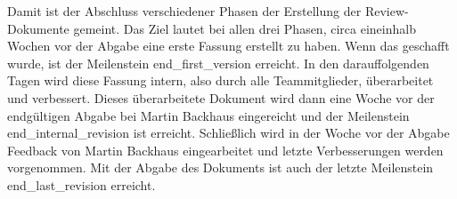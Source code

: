 \documentclass[../review_1.tex]{subfiles}
\begin{document}
Damit ist der Abschluss verschiedener Phasen der Erstellung der Review-Dokumente gemeint. Das Ziel lautet bei allen drei Phasen, circa eineinhalb Wochen vor der Abgabe eine erste Fassung erstellt zu haben. Wenn das geschafft wurde, ist der Meilenstein end\_first\_version erreicht. In den darauffolgenden Tagen wird diese Fassung intern, also durch alle Teammitglieder, überarbeitet und verbessert. Dieses überarbeitete Dokument wird dann eine Woche vor der endgültigen Abgabe bei Martin Backhaus eingereicht und der Meilenstein end\_internal\_revision ist erreicht. Schließlich wird in der Woche vor der Abgabe Feedback von Martin Backhaus eingearbeitet und letzte Verbesserungen werden vorgenommen. Mit der Abgabe des Dokuments ist auch der letzte Meilenstein end\_last\_revision erreicht.\\
\end{document}
